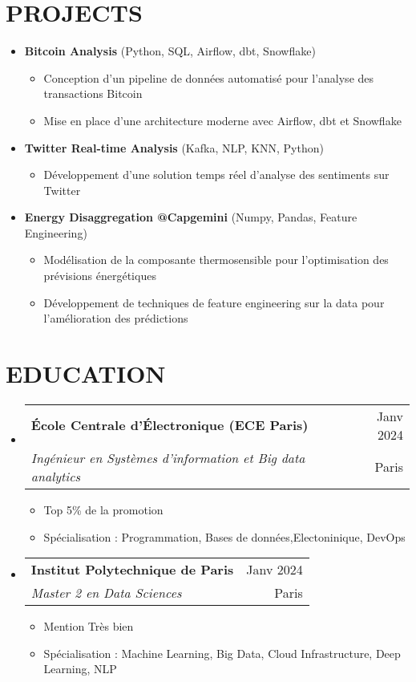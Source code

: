 \documentclass[letterpaper,11pt]{article}
\makeatletter
\newcommand{\resumeItem}[1]{
  \item\small{
    {#1 \vspace{-1pt}}
  }
}
\newcommand{\resumeSubheading}[4]{
  \vspace{-1pt}\item
    \begin{tabular*}{\textwidth}[t]{l@{\extracolsep{\fill}}r}
      \textbf{#1} & {\color{dark-grey}\small #2}\vspace{1pt}\\
      \textit{#3} & {\color{dark-grey} \small #4}\\
    \end{tabular*}\vspace{-4pt}
}
\newcommand{\resumeProjectHeading}[2]{
  \item
  {#1} \hfill {#2}
}
\newcommand{\resumeSubHeadingListStart}{\begin{itemize}[leftmargin=0in, label={}]}
\newcommand{\resumeSubHeadingListEnd}{\end{itemize}}
\newcommand{\resumeItemListStart}{\begin{itemize}[label={\textbullet}]}
\newcommand{\resumeItemListEnd}{\end{itemize}\vspace{0pt}}
\makeatother
\begin{document}
\section{PROJECTS}
\resumeSubHeadingListStart
      \resumeProjectHeading
          {\textbf{Bitcoin Analysis} \small{(Python, SQL, Airflow, dbt, Snowflake)}} {}
          \resumeItemListStart
            \resumeItem{Conception d'un pipeline de données automatisé pour l'analyse des transactions Bitcoin}
            \resumeItem{Mise en place d'une architecture moderne avec Airflow, dbt et Snowflake}
          \resumeItemListEnd
      \resumeProjectHeading
          {\textbf{Twitter Real-time Analysis} \small{(Kafka, NLP, KNN, Python)}} {}
          \resumeItemListStart
            \resumeItem{Développement d'une solution temps réel d'analyse des sentiments sur Twitter}
          \resumeItemListEnd
      \resumeProjectHeading
          {\textbf{Energy Disaggregation @Capgemini} \small{(Numpy, Pandas, Feature Engineering)}} {}
          \resumeItemListStart
            \resumeItem{Modélisation de la composante thermosensible pour l'optimisation des prévisions énergétiques}
            \resumeItem{Développement de techniques de feature engineering sur la data pour l'amélioration des prédictions}
          \resumeItemListEnd
    \resumeSubHeadingListEnd

\section{EDUCATION}
\resumeSubHeadingListStart
    \resumeSubheading
      {École Centrale d'Électronique (ECE Paris)}{Janv 2024}
      {Ingénieur en Systèmes d'information et Big data analytics}{Paris}
      \resumeItemListStart
        \resumeItem{Top 5\% de la promotion}
        \resumeItem{Sp\'{e}cialisation : Programmation, Bases de donn\'{e}es,Electoninique, DevOps}
      \resumeItemListEnd
    \resumeSubheading
      {Institut Polytechnique de Paris}{Janv 2024}
      {Master 2 en Data Sciences}{Paris}
      \resumeItemListStart
        \resumeItem{Mention Tr\`{e}s bien}
        \resumeItem{Sp\'{e}cialisation : Machine Learning, Big Data, Cloud Infrastructure, Deep Learning, NLP}
      \resumeItemListEnd
  \resumeSubHeadingListEnd
\end{document}
